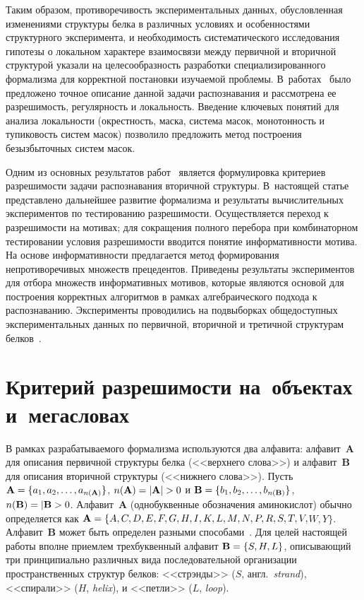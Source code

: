 \begin{multicols}{2}
     Таким образом, противоречивость экспериментальных данных,
обусловленная изменениями структуры белка в различных условиях и
особенностями структурного эксперимента, и необходимость
систематического исследования гипотезы о локальном характере
взаимосвязи между первичной и вторичной структурой указали на
целесообразность разработки специализированного формализма для
корректной постановки изучаемой проблемы. В~работах~\cite{2-t, 3-t} было
предложено точное описание данной задачи распознавания и рассмотрена ее
разрешимость, регулярность и локальность. Введение ключевых понятий для
анализа локальности (окрестность, маска, система масок, монотонность и
тупиковость систем масок) позволило предложить метод построения
безызбыточных систем масок.

Одним из основных результатов работ~\cite{2-t, 3-t} является формулировка
критериев разрешимости задачи распознавания вторичной структуры.
В~настоящей статье представлено дальнейшее развитие формализма и
результаты вычислительных экспериментов по тестированию разрешимости.
Осуществляется переход к разрешимости на мотивах; для сокращения
полного перебора при комбинаторном тестировании условия разрешимости
вводится понятие информативности мотива. На основе информативности
предлагается метод формирования непротиворечивых множеств
прецедентов. Приведены результаты экспериментов для отбора множеств
информативных мотивов, которые являются основой для построения
корректных алгоритмов в рамках алгебраического подхода к распознаванию.
Эксперименты проводились на подвыборках общедоступных
экспериментальных данных по первичной, вторичной и третичной
структурам белков~\cite{4-t}.

\section{Критерий разрешимости на~объектах и~мегасловах}

В рамках разрабатываемого формализма используются два алфавита:
алфавит~\textbf{A} для описания первичной структуры белка (<<верхнего
слова>>) и алфавит~\textbf{B} для описания вторичной структуры (<<нижнего
слова>>). Пусть $\mathbf{A} \hm= \{a_1, a_2, \ldots , a_{n(\mathbf{A})}\}$,
$n(\mathbf{A})\hm=\vert \mathbf{A}\vert \hm> 0$ и $\mathbf{B} \hm= \{b_1, b_2, \ldots
, b_{n(\mathbf{B})}\}$, $n(\mathbf{B})\hm=\vert \mathbf{B} \hm> 0$. Алфавит~\textbf{A}
(однобуквенные обозначения аминокислот) обычно определяется как
$\mathbf{A} \hm= \{A, C, D, E, F, G, H, I, K, L, M, N, P, R, S, T, V,$\linebreak $ W, Y\}$.
Алфавит~$\mathbf{B}$ может быть определен разными способами~\cite{3-t}.
Для целей настоящей работы вполне приемлем трехбуквенный алфавит
$\mathbf{B} \hm= \{S, H, L\}$, описывающий три принципиально различных
вида последовательной организации пространственных структур белков:
<<стрэнды>> ($S$, англ.\ \textit{strand}), <<спирали>> ($H$, \textit{helix}), и
<<петли>> ($L$, \textit{loop}).


\end{multicols}
